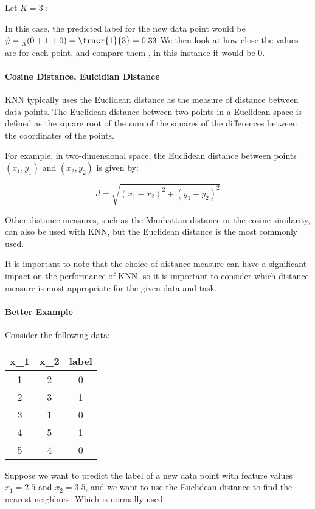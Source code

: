 \documentclass{article}
\theoremstyle{mytheoremstyle}
\theoremstyle{mytheoremstyle}
\theoremstyle{myproblemstyle}
\begin{document}
Let $K = 3$ :

In this case, the predicted label for the new data point would be
$\hat{y} = \frac{1}{3} (0 + 1+ 0) = \fracr{1}{3} = 0.33$ We then look at how close the values are for each point, and compare them , in this instance it would be 0.

\paragraph{Cosine Distance, Eulcidian Distance}
KNN typically uses the Euclidean distance as the measure of distance between data points. The Euclidean distance between two points in a Euclidean space is defined as the square root of the sum of the squares of the differences between the coordinates of the points.

For example, in two-dimensional space, the Euclidean distance between points $(x_1, y_1)$ and $(x_2, y_2)$ is given by:

$$ d = \sqrt{(x_1 - x_2)^2 + (y_1 - y_2)^2} $$

Other distance measures, such as the Manhattan distance or the cosine similarity, can also be used with KNN, but the Euclidean distance is the most commonly used.

It is important to note that the choice of distance measure can have a significant impact on the performance of KNN, so it is important to consider which distance measure is most appropriate for the given data and task.

\paragraph{Better Example}
Consider the following data:
\begin{center}
	\begin{tabular}{ c c c }
		x_1 & x_2 & label \\
		\hline
		1   & 2   & 0     \\
		2   & 3   & 1     \\
		3   & 1   & 0     \\
		4   & 5   & 1     \\
		5   & 4   & 0     \\
	\end{tabular}
\end{center}
Suppose we want to predict the label of a new data point with feature values $x_1 = 2.5$ and $x_2 = 3.5$, and we want to use the Euclidean distance to find the nearest neighbors. Which is normally used.
\end{document}
